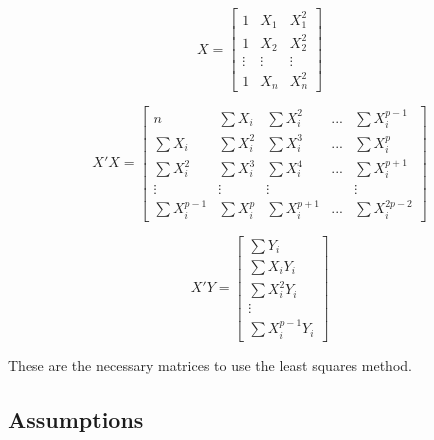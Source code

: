 	
	
	$$X=
	\left[
	\begin{array}{ccc}
		1 &X_1	& X_1^2\\ 
		1 & X_2 & X_2^2	\\
		\vdots & \vdots & \vdots \\
		1 & X_n& X_n^2
	\end{array}
	\right]
	$$
	
	$$X'X=
	\left[
	\begin{array}{ccccc}
		n &\sum X_i	& \sum X_i^2 & ... &\sum X_i^{p-1}\\ 
		\sum X_i & \sum X_i^2 & \sum X_i^3&...& \sum X_i^p	\\
		\sum X_i^2 & \sum X_i^3 & \sum X_i^4 & ... & \sum X_i^{p+1}\\
		\vdots&\vdots&\vdots& & \vdots	\\
		\sum X_i^{p-1} &\sum X_i^p& \sum X_i^{p+1} & ... & \sum X_i^{2p-2}
	\end{array}
	\right]
	$$
	
	$$X' Y=
	\left[
	\begin{array}{c}
		\sum Y_i\\ 
		\sum X_i Y_i	\\
		\sum X_i^2 Y_i \\
		\vdots	\\
		\sum X_i^{p-1} Y_i
	\end{array}
	\right]
	$$
	
	These are the necessary matrices to use the least squares method.
	
	
	
	


	\subsection{Assumptions}
	